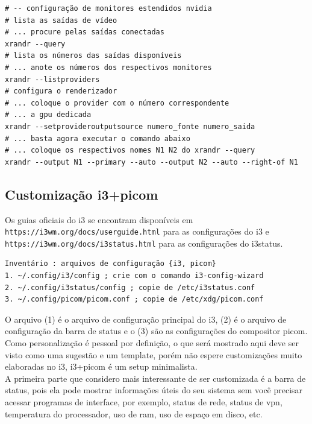 \documentclass[12pt,a4paper]{article}
\begin{document}
\begin{lstlisting}
# -- configuração de monitores estendidos nvidia 
# lista as saídas de vídeo 
# ... procure pelas saídas conectadas 
xrandr --query
# lista os números das saídas disponíveis 
# ... anote os números dos respectivos monitores
xrandr --listproviders 
# configura o renderizador
# ... coloque o provider com o número correspondente
# ... a gpu dedicada
xrandr --setprovideroutputsource numero_fonte numero_saida
# ... basta agora executar o comando abaixo 
# ... coloque os respectivos nomes N1 N2 do xrandr --query 
xrandr --output N1 --primary --auto --output N2 --auto --right-of N1

\end{lstlisting}

\subsection{Customização i3+picom}

\hspace{\baselineskip}

Os guias oficiais do i3 se encontram disponíveis em \texttt{https://i3wm.org/docs/userguide.html} para as configurações do i3 e \texttt{https://i3wm.org/docs/i3status.html} para as configurações do i3status. \\

\begin{lstlisting}
Inventário : arquivos de configuração {i3, picom}
1. ~/.config/i3/config ; crie com o comando i3-config-wizard
2. ~/.config/i3status/config ; copie de /etc/i3status.conf 
3. ~/.config/picom/picom.conf ; copie de /etc/xdg/picom.conf
\end{lstlisting}

\vspace{\baselineskip}

O arquivo (1) é o arquivo de configuração principal do i3, (2) é o arquivo de configuração da barra de status e o (3) são as configurações do compositor picom. Como personalização é pessoal por definição, o que será mostrado aqui deve ser visto como uma sugestão e um template, porém não espere customizações muito elaboradas no i3, i3+picom é um setup minimalista. \\

A primeira parte que considero mais interessante de ser customizada é a barra de status, pois ela pode mostrar informações úteis do seu sistema sem você precisar acessar programas de interface, por exemplo, status de rede, status de vpn, temperatura do processador, uso de ram, uso de espaço em disco, etc.\\
\end{document}
